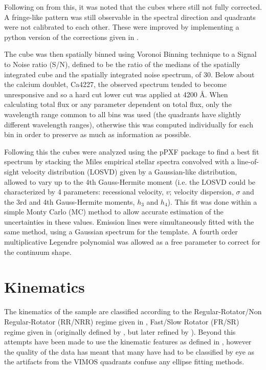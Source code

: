 \documentclass[fleqn,usenatbib,useAMS]{mnras}
\begin{document}

		Following on from this, it was noted that the cubes where still not fully corrected. A fringe-like pattern was still observable in the spectral direction and quadrants were not calibrated to each other. These were improved by implementing a python version of the corrections given in \citet{Lagerholm2012}. 


		The cube was then spatially binned using Voronoi Binning technique \citep{Cappellari2003} to a Signal to Noise ratio (S/N), defined to be the ratio of the medians of the spatially integrated cube and the spatially integrated noise spectrum, of 30. Below about the calcium doublet, Ca4227, the observed spectrum tended to become unresponsive and so a hard cut lower cut was applied at 4200 \AA. When calculating total flux or any parameter dependent on total flux, only the wavelength range common to all bins was used (the quadrants have slightly different wavelength ranges), otherwise this was computed individually for each bin in order to preserve as much as information as possible.

		Following this the cubes were analyzed using the pPXF package \citep{Cappellari2004} to find a best fit spectrum by stacking the Miles empirical stellar spectra \citep{Sanchez-Blazquez2006} convolved with a line-of-sight velocity distribution (LOSVD) given by a Gaussian-like distribution, allowed to vary up to the 4th Gauss-Hermite moment (i.e. the LOSVD could be characterized by 4 parameters: recessional velocity, $v$; velocity dispersion, $\sigma$ and the 3rd and 4th Gauss-Hermite moments, $h_3$ and $h_4$). This fit was done within a simple Monty Carlo (MC) method to allow accurate estimation of the uncertainties in these values. Emission lines were simultaneously fitted with the same method, using a Gaussian spectrum for the template. A fourth order multiplicative Legendre polynomial was allowed as a free parameter to correct for the continuum shape. 

\section{Kinematics}
	\label{sec:kine}
	The kinematics of the sample are classified according to the Regular-Rotator/Non Regular-Rotator (RR/NRR) regime given in \citet{Krajnovic2011}, Fast/Slow Rotator (FR/SR) regime given in \citet{Cappellari2016} (originally defined by \citet{Emsellem2011}, but later refined by \citet{Cappellari2016}). Beyond this attempts have been made to use the kinematic features as defined in \citet{Krajnovic2011}, however the quality of the data has meant that many have had to be classified by eye as the artifacts from the VIMOS quadrants confuse any ellipse fitting methods. 
\end{document}
